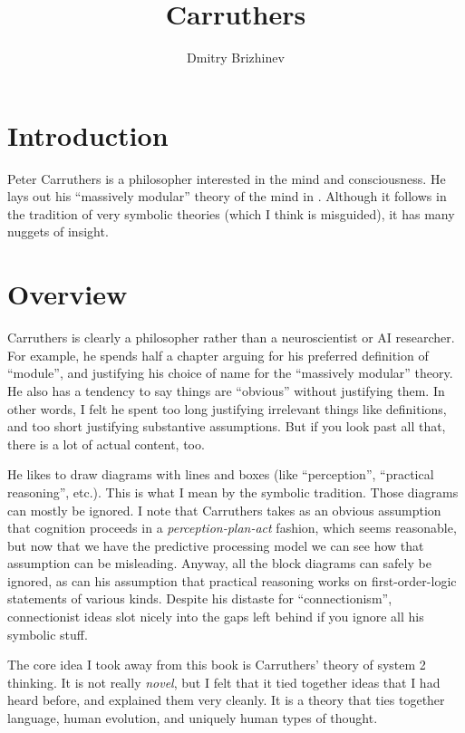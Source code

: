 \documentclass[10pt,a4paper]{article}
\newcommand{\nquote}[1]{``{#1}''}
\begin{document}
\title{\vspace{-10ex}Carruthers}
\author{Dmitry Brizhinev}
\maketitle

\section{Introduction}
Peter Carruthers is a philosopher interested in the mind and consciousness. He lays out his \nquote{massively modular} theory of the mind in \cite{carruthers}. Although it follows in the tradition of very symbolic theories (which I think is misguided), it has many nuggets of insight.

\section{Overview}
Carruthers is clearly a philosopher rather than a neuroscientist or AI researcher. For example, he spends half a chapter arguing for his preferred definition of \nquote{module}, and justifying his choice of name for the \nquote{massively modular} theory. He also has a tendency to say things are \nquote{obvious} without justifying them. In other words, I felt he spent too long justifying irrelevant things like definitions, and too short justifying substantive assumptions. But if you look past all that, there is a lot of actual content, too.

He likes to draw diagrams with lines and boxes (like \nquote{perception}, \nquote{practical reasoning}, etc.). This is what I mean by the symbolic tradition. Those diagrams can mostly be ignored. I note that Carruthers takes as an obvious assumption that cognition proceeds in a \emph{perception-plan-act} fashion, which seems reasonable, but now that we have the predictive processing model we can see how that assumption can be misleading. Anyway, all the block diagrams can safely be ignored, as can his assumption that practical reasoning works on first-order-logic statements of various kinds. Despite his distaste for \nquote{connectionism}, connectionist ideas slot nicely into the gaps left behind if you ignore all his symbolic stuff.

The core idea I took away from this book is Carruthers' theory of system 2 thinking. It is not really \emph{novel}, but I felt that it tied together ideas that I had heard before, and explained them very cleanly. It is a theory that ties together language, human evolution, and uniquely human types of thought.
\end{document}
